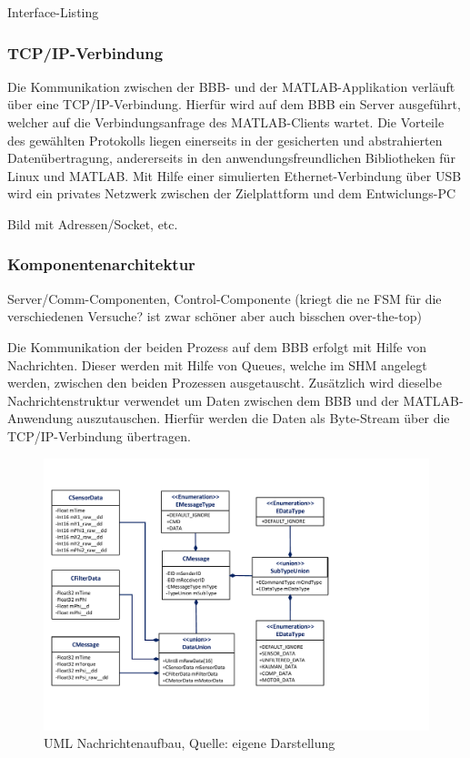 Interface-Listing

\subsubsection{TCP/IP-Verbindung}
Die Kommunikation zwischen der \ac{BBB}- und der MATLAB-Applikation verläuft über eine TCP/IP-Verbindung. Hierfür wird auf dem \ac{BBB} ein Server ausgeführt, welcher auf die Verbindungsanfrage des MATLAB-Clients wartet. Die Vorteile des gewählten Protokolls liegen einerseits in der gesicherten und abstrahierten Datenübertragung, andererseits in den anwendungsfreundlichen Bibliotheken für Linux und MATLAB. Mit Hilfe einer simulierten Ethernet-Verbindung über USB wird ein privates Netzwerk zwischen der Zielplattform und dem Entwiclungs-PC 

Bild mit Adressen/Socket, etc.

\subsubsection{Komponentenarchitektur}
Server/Comm-Componenten, Control-Componente (kriegt die ne FSM für die verschiedenen Versuche? ist zwar schöner aber auch bisschen over-the-top)

Die Kommunikation der beiden Prozess auf dem \ac{BBB} erfolgt mit Hilfe von Nachrichten. Dieser werden mit Hilfe von Queues, welche im \ac{SHM} angelegt werden, zwischen den beiden Prozessen ausgetauscht. Zusätzlich wird dieselbe Nachrichtenstruktur verwendet um Daten zwischen dem \ac{BBB} und der MATLAB-Anwendung auszutauschen. Hierfür werden die Daten als Byte-Stream über die TCP/IP-Verbindung übertragen. 

\begin{figure}[!h]
\centering
\includegraphics[width=0.8\linewidth, trim={0cm 2cm 7cm 2cm},clip]{img/UML_MessageClassDiag}
\caption{UML Nachrichtenaufbau, Quelle: eigene Darstellung}
\end{figure}

